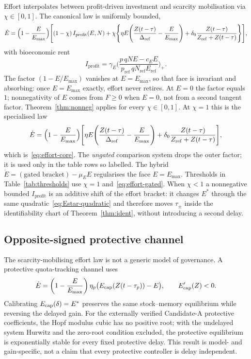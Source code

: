 \documentclass[11pt]{article}
\theoremstyle{definition}
\begin{document}
Effort interpolates between profit-driven investment and scarcity mobilisation via $\chi\in[0,1]$. The canonical law is uniformly bounded,
\begin{equation}
\dot E=
\Bigl(1-\frac{E}{E_{\max}}\Bigr)
\Biggl[
(1-\chi)\,I_{\mathrm{profit}}(E,N)
+\chi\Biggl\{\eta E\Biggl(\frac{Z(t-\tau)}{\Delta_{\mathrm{ref}}}-\frac{E}{E_{\max}}\Biggr)
+\delta_0\frac{Z(t-\tau)}{Z_{\mathrm{ref}}+Z(t-\tau)}\Biggr\}
\Biggr],
\label{eq:effort-generalized}
\end{equation}
with bioeconomic rent \cite{gordon1954,clark1976}
\begin{equation}
I_{\mathrm{profit}}=\gamma_E\Biggl(\frac{p\,qNE-c_E E}{p_{\mathrm{ref}}\,q N_{\mathrm{ref}}E_{\mathrm{ref}}}\Biggr)_+.
\label{eq:profit}
\end{equation}
The factor $(1-E/E_{\max})$ vanishes at $E=E_{\max}$, so that face is invariant and absorbing: once $E=E_{\max}$ exactly, effort never retires. At $E=0$ the factor equals $1$; nonnegativity of $E$ comes from $F\ge 0$ when $E=0$, not from a second tangent factor. Theorem~\ref{thm:nonneg} applies for every $\chi\in[0,1]$. At $\chi=1$ this is the specialised law
\begin{equation}
\dot E=\Bigl(1-\frac{E}{E_{\max}}\Bigr)\Biggl[\eta E\Biggl(\frac{Z(t-\tau)}{\Delta_{\mathrm{ref}}}-\frac{E}{E_{\max}}\Biggr)
+\delta_0\frac{Z(t-\tau)}{Z_{\mathrm{ref}}+Z(t-\tau)}\Biggr],
\label{eq:effort-gated}
\end{equation}
which is~\eqref{eq:effort-core}. The \emph{ungated} comparison system drops the outer factor; it is used only in the table rows so labelled. The hybrid $\dot E=(\text{gated bracket})-\mu_E E$ regularises the face $E=E_{\max}$. Thresholds in Table~\ref{tab:thresholds} use $\chi=1$ and~\eqref{eq:effort-gated}. When $\chi<1$ a nonnegative bounded $I_{\mathrm{profit}}$ is an additive shift of the effort bracket: it changes $E^*$ through the same quadratic~\eqref{eq:Estar-quadratic} and therefore moves $\tau_\pm$ inside the identifiability chart of Theorem~\ref{thm:ident}, without introducing a second delay.

\subsection{Opposite-signed protective channel}
\label{sec:protective-bridge}

The scarcity-mobilising effort law is not a generic model of governance. A protective quota-tracking channel uses
\[
\dot E=\left(1-\frac{E}{E_{\max}}\right)
\eta_p\bigl(E_{\rm cap}(Z(t-\tau_p))-E\bigr),
\qquad E_{\rm cap}'(Z)<0.
\]
Calibrating $E_{\rm cap}(\delta)=E^*$ preserves the same stock--memory equilibrium while reversing the delayed gain. For the externally verified Candidate-A protective coefficients, the Hopf modulus cubic has no positive root; with the undelayed system Hurwitz and the zero-root condition excluded, the protective equilibrium is exponentially stable for every fixed protective delay. This result is model- and gain-specific, not a claim that every protective controller is delay independent.
\end{document}
